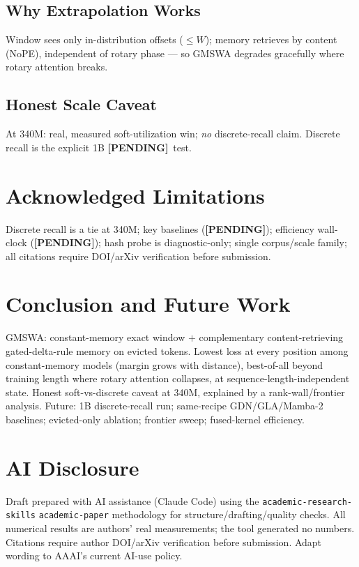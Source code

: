 \documentclass[11pt]{article}
\newcommand{\pending}{\textbf{[PENDING]}}
\begin{document}
\subsection{Why Extrapolation Works}
Window sees only in-distribution offsets ($\le W$); memory retrieves by content (NoPE),
independent of rotary phase --- so GMSWA degrades gracefully where rotary attention breaks.
\subsection{Honest Scale Caveat}
At 340M: real, measured soft-utilization win; \emph{no} discrete-recall claim. Discrete recall
is the explicit 1B \pending\ test.

\section{Acknowledged Limitations}
Discrete recall is a tie at 340M; key baselines (\pending); efficiency wall-clock (\pending);
hash probe is diagnostic-only; single corpus/scale family; all citations require
DOI/arXiv verification before submission.

\section{Conclusion and Future Work}
GMSWA: constant-memory exact window $+$ complementary content-retrieving gated-delta-rule
memory on evicted tokens. Lowest loss at every position among constant-memory models
(margin grows with distance), best-of-all beyond training length where rotary attention
collapses, at sequence-length-independent state. Honest soft-vs-discrete caveat at 340M,
explained by a rank-wall/frontier analysis. Future: 1B discrete-recall run; same-recipe
GDN/GLA/Mamba-2 baselines; evicted-only ablation; frontier sweep; fused-kernel efficiency.

\section*{AI Disclosure}
Draft prepared with AI assistance (Claude Code) using the \texttt{academic-research-skills}
\texttt{academic-paper} methodology for structure/drafting/quality checks. All numerical
results are authors' real measurements; the tool generated no numbers. Citations require
author DOI/arXiv verification before submission. Adapt wording to AAAI's current AI-use policy.
\end{document}

